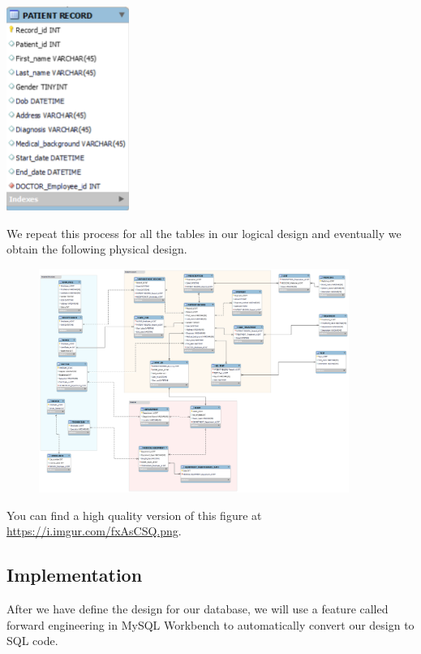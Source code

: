 \documentclass[a4paper]{article}
\numberwithin{equation}{section}
\begin{document}
\begin{center}
  \includegraphics[width=0.3\textwidth]{assets/physical_ex.PNG}
\end{center}

We repeat this process for all the tables in our logical design and eventually we obtain the following physical design.

\begin{figure}[H]
  \centering
  \includegraphics[width=0.9\textwidth]{./assets/logical.png}\label{Logical design}
\end{figure}

You can find a high quality version of this figure at \url{https://i.imgur.com/fxAsCSQ.png}.

\subsection{Implementation}
After we have define the design for our database, we will use a feature called forward engineering in MySQL Workbench to automatically convert our design to SQL code.
\end{document}
